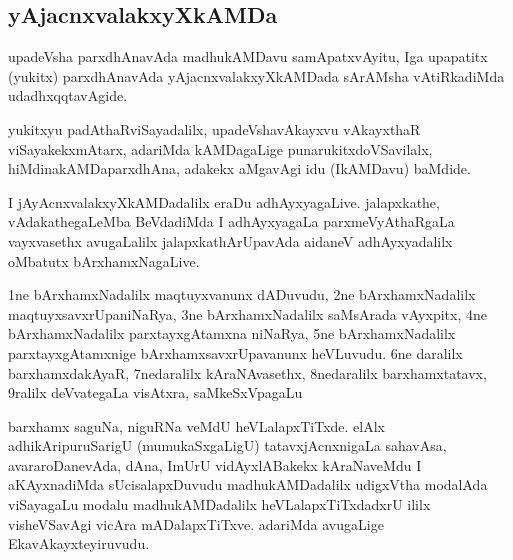 \begin{center}
\section*{yAjacnxvalakxyXkAMDa}
\end{center}
\centerline{}

\begin{artha}
upadeVsha parxdhAnavAda madhukAMDavu samApatxvAyitu, Iga upapatitx (yukitx) parxdhAnavAda 
yAjacnxvalakxyXkAMDada sArAMsha vAtiRkadiMda udadhxqqtavAgide.

yukitxyu padAthaRviSayadalilx, upadeVshavAkayxvu vAkayxthaR viSayakekxmAtarx, adariMda 
kAMDagaLige punarukitxdoVSavilalx, hiMdinakAMDaparxdhAna, adakekx aMgavAgi idu 
(IkAMDavu) baMdide.  
\end{artha}

\centerline{}

I jAyAcnxvalakxyXkAMDadalilx eraDu adhAyxyagaLive. jalapxkathe, vAdakathegaLeMba BeVdadiMda 
I adhAyxyagaLa parxmeVyAthaRgaLa vayxvasethx avugaLalilx jalapxkathArUpavAda aidaneV 
adhAyxyadalilx oMbatutx bArxhamxNagaLive.

\centerline{}

\begin{artha}
1ne bArxhamxNadalilx maqtuyxvanunx dADuvudu, 2ne bArxhamxNadalilx maqtuyxsavxrUpaniNaRya, 3ne bArxhamxNadalilx saMsArada vAyxpitx, 4ne bArxhamxNadalilx parxtayxgAtamxna niNaRya, 5ne bArxhamxNadalilx parxtayxgAtamxnige bArxhamxsavxrUpavanunx heVLuvudu. 6ne daralilx barxhamxdakAyaR, 7nedaralilx kAraNAvasethx, 8nedaralilx barxhamxtatavx, 9ralilx deVvategaLa visAtxra, saMkeSxVpagaLu 

barxhamx saguNa, niguRNa veMdU heVLalapxTiTxde. elAlx adhikAripuruSarigU (mumukaSxgaLigU) tatavxjAcnxnigaLa sahavAsa, avararoDanevAda, dAna, ImUrU vidAyxlABakekx kAraNaveMdu I aKAyxnadiMda sUcisalapxDuvudu madhukAMDadalilx udigxVtha modalAda viSayagaLu modalu madhukAMDadalilx heVLalapxTiTxdadxrU ililx visheVSavAgi vicAra mADalapxTiTxve. adariMda avugaLige EkavAkayxteyiruvudu.
\end{artha}

